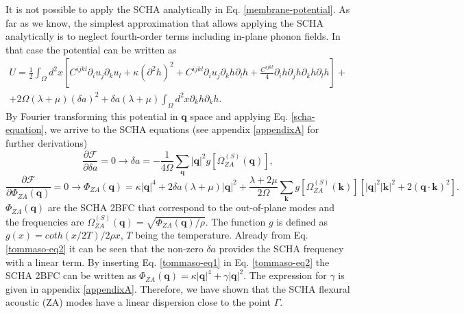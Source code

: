 It is not possible to apply the SCHA analytically in Eq. \ref{membrane-potential}. As far as we know, the simplest 
approximation that allows applying the SCHA analytically is to neglect fourth-order terms including in-plane phonon 
fields. In that case the potential can be written as
\begin{multline}
\label{membrane-potential-tommaso}
U=\frac{1}{2}\int_{\Omega}d^{2}x[C^{ijkl}\partial_{i}u_{j}\partial_{k}u_{l}+\kappa(\partial^{2}h)^{2}+
C^{ijkl}\partial_{i}u_{j}\partial_{k}h\partial_{l}h+\frac{C^{ijkl}}{4}\partial_{i}h\partial_{j}h\partial_{k}h\partial_{l}h]+\\+2\Omega(\lambda+\mu)(\delta a)^{2}+\delta a(\lambda+\mu)\int_{\Omega}d^{2}x\partial_{k}h\partial_{k}h.
\end{multline}
By Fourier transforming this potential in $\boldsymbol{q}$ space and applying Eq. \ref{scha-equation}, we arrive to 
the SCHA equations (see appendix \ref{appendixA} for further derivations)
\begin{equation}
\label{tommaso-eq1}
\frac{\partial\mathcal{F}}{\partial\delta a}=0\rightarrow\delta a=-\frac{1}{4\Omega}\sum_{\boldsymbol{q}}|\boldsymbol{q}|^{2}g[\Omega_{ZA}^{(S)}(\boldsymbol{q})],
\end{equation}   
\begin{equation}
\label{tommaso-eq2}
\frac{\partial\mathcal{F}}{\partial\Phi_{ZA}(\boldsymbol{q})}=0\rightarrow\Phi_{ZA}(\boldsymbol{q})=\kappa|\boldsymbol{q}|^{4}+2\delta a(\lambda+\mu)|\boldsymbol{q}|^{2}+\frac{\lambda+2\mu}{2\Omega}\sum_{\boldsymbol{k}}g[\Omega_{ZA}^{(S)}(\boldsymbol{k})][|\boldsymbol{q}|^{2}|\boldsymbol{k}|^{2}+2(\boldsymbol{q}\cdot\boldsymbol{k})^{2}].
\end{equation}
$\Phi_{ZA}(\boldsymbol{q})$ are the SCHA 2BFC that correspond to the out-of-plane modes and the frequencies are 
$\Omega_{ZA}^{(S)}(\boldsymbol{q})=\sqrt{\Phi_{ZA}(\boldsymbol{q})/\rho}$. The function $g$ is defined as
$g(x)=coth(x/2T)/2\rho x$, $T$ being the temperature. Already from Eq. \ref{tommaso-eq2} it can be seen that the 
non-zero $\delta a$ provides the SCHA frequency with a linear term. By inserting Eq. \ref{tommaso-eq1} in 
Eq. \ref{tommaso-eq2} the SCHA 2BFC can be written as 
$\Phi_{ZA}(\boldsymbol{q})=\kappa|\boldsymbol{q}|^{4}+\gamma|\boldsymbol{q}|^{2}$. The expression for $\gamma$ is 
given in appendix \ref{appendixA}. Therefore, we have shown that the SCHA flexural acoustic (ZA) modes have a linear 
dispersion close to the point $\Gamma$. \\

